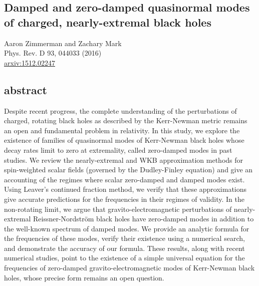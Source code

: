 \begin{refsection}

\newcommand{\ba}{\begin{align}}
\newcommand{\ea}{\end{align}}
\newcommand{\bma}{\begin{pmatrix}}
\newcommand{\ema}{\end{pmatrix}}
\newcommand{\R}[1]{\textcolor{red}{#1}}

\chapter{Damped and zero-damped quasinormal modes of charged, nearly-extremal black holes}
\label{chap:Extremal}

\begin{centering}
Aaron Zimmerman and Zachary Mark \\
Phys. Rev. D 93, 044033 (2016) \\
\href{https://https://arxiv.org/abs/1512.02247}{arxiv:1512.02247} \\
\end{centering}

\section{abstract}
Despite recent progress, the complete understanding of the perturbations of charged, rotating black holes as described by the Kerr-Newman metric remains an open and fundamental problem in relativity.
In this study, we explore the existence of families of quasinormal modes of Kerr-Newman black holes whose decay rates limit to zero at extremality, called zero-damped modes in past studies.  
We review the nearly-extremal and WKB approximation methods for spin-weighted scalar fields (governed by the Dudley-Finley equation) and give an accounting of the regimes where scalar zero-damped and damped modes exist.
Using Leaver's continued fraction method, we verify that these approximations give accurate predictions for the frequencies in their regimes of validity.
In the non-rotating limit, we argue that gravito-electromagnetic perturbations of nearly-extremal Reissner-Nordstr\"{o}m black holes have zero-damped modes in addition to the well-known spectrum of damped modes.
We provide an analytic formula for the frequencies of these modes, verify their existence using a numerical search, and demonstrate the accuracy of our formula. 
These results, along with recent numerical studies, point to the existence of a simple universal equation for the frequencies of zero-damped gravito-electromagnetic modes of Kerr-Newman black holes, whose precise form remains an open question.


\end{refsection}
